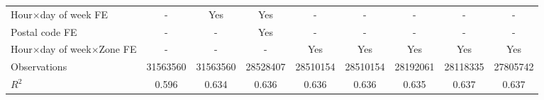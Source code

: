 {\begin{tabular}{l*{8}{S}}
\addlinespace
Hour\(\times\)day of week FE&         {-}         &       {Yes}         &       {Yes}         &         {-}         &         {-}         &         {-}         &         {-}         &         {-}         \\
\addlinespace
Postal code FE      &         {-}         &         {-}         &       {Yes}         &         {-}         &         {-}         &         {-}         &         {-}         &         {-}         \\
\addlinespace
Hour\(\times\)day of week\(\times\)Zone FE&         {-}         &         {-}         &         {-}         &       {Yes}         &       {Yes}         &       {Yes}         &       {Yes}         &       {Yes}         \\
\midrule
Observations        &\num{31563560}         &\num{31563560}         &\num{28528407}         &\num{28510154}         &\num{28510154}         &\num{28192061}         &\num{28118335}         &\num{27805742}         \\
$R^2$             &     {0.596}         &     {0.634}         &     {0.636}         &     {0.636}         &     {0.636}         &     {0.635}         &     {0.637}         &     {0.637}         \\
\bottomrule
\end{tabular}
}
